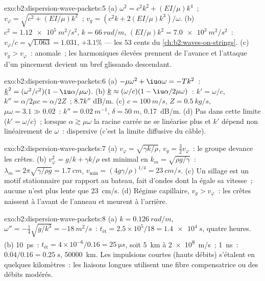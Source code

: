 \begin{solution}{exo:b2:dispersion-wave-packets:5}
(a) $\omega^2 = c^2k^2 + (EI/\mu)k^4$~; $v_\varphi = \sqrt{c^2 + (EI/\mu)k^2}$~; $v_g = (c^2k +
2(EI/\mu)k^3)/\omega$. (b) $c^2 = \qty{1.12e5}{m^2/s^2}$, $k = \qty{66}{rad/m}$, $(EI/\mu)k^2
= \qty{7.0e3}{m^2/s^2}$~: $v_\varphi/c = \sqrt{1.063} = 1.031$, $+3.1\%$ --- les $53$ cents du
\cref{ch:b2:waves-on-strings}. (c) $v_g > v_\varphi$~: anomale~; les harmoniques
élevées prennent de l'avance et l'attaque d'un pincement devient un bref
glissando descendant.
\end{solution}

\begin{solution}{exo:b2:dispersion-wave-packets:6}
(a) $-\mu\omega^2 + \iu\alpha\omega = -Tk^2$~: $\underline k^2 = (\omega^2/c^2)(1 - \iu\alpha/\mu\omega)$.
(b) $\underline k \approx (\omega/c)(1 - \iu\alpha/2\mu\omega)$~: $k' = \omega/c$, $k'' = \alpha/2\mu c =
\alpha/2Z$~; $8.7k''$ dB/m. (c) $c = \qty{100}{m/s}$, $Z = \qty{0.5}{kg/s}$, $\mu\omega = 3.1 \gg
0.02$~: $k'' = \qty{0.02}{m^{-1}}$, $\delta = \qty{50}{m}$, \qty{0.17}{dB/m}. (d) Pas dans cette
limite ($k' = \omega/c$)~; lorsque $\alpha \gtrsim \mu\omega$ la racine carrée ne se
linéarise plus et $k'$ dépend non linéairement de $\omega$~: dispersive (c'est la
limite diffusive du câble).
\end{solution}

\begin{solution}{exo:b2:dispersion-wave-packets:7}
(a) $v_\varphi = \sqrt{\gamma k/\rho}$, $v_g = \tfrac32v_\varphi$~: le groupe devance les
crêtes. (b) $v_\varphi^2 = g/k + \gamma k/\rho$ est minimal en $k_m = \sqrt{\rho g/\gamma}$~:
$\lambda_m = 2\pi\sqrt{\gamma/\rho g} = \qty{1.7}{cm}$, $v_{\min} = (4g\gamma/\rho)^{1/4} =
\qty{23}{cm/s}$. (c) Un sillage est un motif stationnaire par rapport au
bateau, fait d'ondes dont la  égale sa vitesse~; aucune n'est
plus lente que \qty{23}{cm/s}. (d) Régime capillaire, $v_g > v_\varphi$~: les crêtes
naissent à l'avant de l'anneau et meurent à l'arrière.
\end{solution}

\begin{solution}{exo:b2:dispersion-wave-packets:8}
(a) $k = \qty{0.126}{rad/m}$, $\omega'' = -\tfrac14\sqrt{g/k^3} = \qty{-18}{m^2/s}$~: $t_{\text{ét}}
= 2.5 \times 10^5/18 = \qty{1.4e4}{s}$, quatre heures. (b) \qty{10}{ps}~: $t_{\text{ét}} =
4 \times 10^{-6}/0.16 = \qty{25}{\micro s}$, soit \qty{5}{km} à \qty{2e8}{m/s}~; \qty{1}{ns}~: $0.04/0.16 =
\qty{0.25}{s}$, \qty{50000}{km}. Les impulsions courtes (hauts débits) s'étalent en quelques
kilomètres~: les liaisons longues utilisent une fibre compensatrice ou des débits modérés.
\end{solution}

